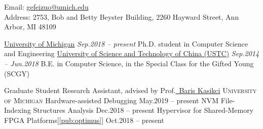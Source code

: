 \documentclass[10pt,a4paper]{article}
\newcommand{\seperator}{\spacedhrule{0.5em}{-1em}}
\begin{document}
\sloppy  %



\nobreakvspace{0.3em}  %

\noindent Email: \href{mailto:gefeizuo@umich.edu}{\mbox{gefeizuo@umich.edu}}
\\
Address: 2753, Bob and Betty Beyster Building, 2260 Hayward Street, Ann Arbor, MI 48109

\seperator  %

\headedsection
{\href{https://umich.edu}{University of Michigan}}
{\textit{Sep.2018 -- present}}
{
	\headedsubsection
	{Ph.D. student in Computer Science and Engineering}
	{}
	{}
}
\headedsection  %
{\href{http://ustc.edu.cn/}{University of Science and Technology of China (USTC)}}
{\textit{Sep.2014 -- Jun.2018}} {
	\headedsubsection
	{B.E. in Computer Science, in the Special Class for the Gifted Young (SCGY)}
	{}
	{}
}

\seperator


\headedsection
{Graduate Student Research Assistant, advised by Prof.\href{https://web.eecs.umich.edu/~barisk/}{\ Baris Kasikci}}
{\textsc{University of Michigan}}
{
	\headedsubsection
	{Hardware-assisted Debugging}
	{May.2019 -- present}
	{}
	\headedsubsection
	{NVM File-Indexing Structures Analysis}
	{Dec.2018 -- present}
	{}
	\headedsubsection
	{Hypervisor for Shared-Memory FPGA Platforms[\ref{pub:optimus}]}
	{Oct.2018 -- present}
	{}
}
\end{document}
